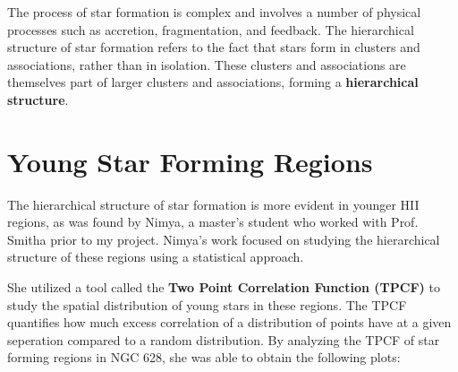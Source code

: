 \documentclass[12pt]{report}
\begin{document}
The process of star formation is complex and involves a number of physical processes such as accretion, fragmentation, and feedback. The hierarchical structure of star formation refers to the fact that stars form in clusters and associations, rather than in isolation. These clusters and associations are themselves part of larger clusters and associations, forming a \textbf{hierarchical structure}. \cite{menon2021dependence} 


\section{Young Star Forming Regions}
The hierarchical structure of star formation is more evident in younger HII regions, as was found by Nimya, a master's student who worked with Prof. Smitha prior to my project. Nimya's work focused on studying the hierarchical structure of these regions using a statistical approach. 

She utilized a tool called the \textbf{Two Point Correlation Function (TPCF)} to study the spatial distribution of young stars in these regions. The TPCF quantifies how much excess correlation of a distribution of points have at a given seperation compared to a random distribution. By analyzing the TPCF of star forming regions in NGC 628, she was able to obtain the following plots: 
\end{document}
